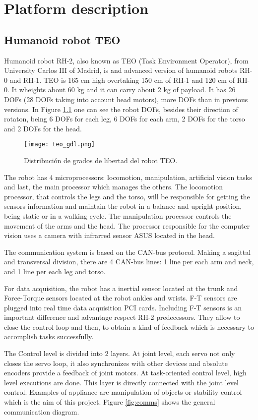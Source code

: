 
\chapter{Platform description} 
\label{cap:platform_description}
\section{Humanoid robot TEO}
Humanoid robot RH-2, also known as TEO (Task Environment Operator), from University Carlos III of Madrid, is and advanced version of humanoid robots RH-0 and RH-1. TEO is 165 cm high overtaking 150 cm of RH-1 and 120 cm of RH-0. It wheights about 60 kg and it can carry about 2 kg of payload. It has 26 DOFs (28 DOFs taking into account head motors), more DOFs than in previous versions. In Figure \ref{fig:gdl} one can see the robot DOFs, besides their direction of rotaton, being 6 DOFs for each leg, 6 DOFs for each arm, 2 DOFs for the torso and 2 DOFs for the head.

\begin{figure}[!hbt]
\centering
\texttt{[image: teo\_gdl.png]}
\caption{Distribución de grados de libertad del robot TEO.}
\label{fig:gdl}
\end{figure}

The robot has 4 microprocessors: locomotion, manipulation, artificial vision tasks and last, the main processor which manages the others. The locomotion processor, that controls the legs and the torso, will be responsible for getting the sensors information and maintain the robot in a balance and upright position, being static or in a walking cycle. The manipulation processor controls the movement of the arms and the head. The processor responsible for the computer vision uses a camera with infrarred sensor ASUS located in the head.

The communication system is based on the CAN-bus protocol. Making a sagittal and transversal division, there are 4 CAN-bus lines: 1 line per each arm and neck, and 1 line per each leg and torso.

For data acquisition, the robot has a inertial sensor located at the trunk and Force-Torque sensors located at the robot ankles and wrists. F-T sensors are plugged into real time data acquisition PCI cards. Including F-T sensors is an important difference and advantage respect RH-2 predecessors. They allow to close the control loop and then, to obtain a kind of feedback which is necessary to accomplish tasks successfully.

The Control level is divided into 2 layers. At joint level, each servo not only closes the servo loop, it also synchronizes with other devices and absolute encoders provide a feedback of joint motors. At task-oriented control level, high level executions are done. This layer is directly connected with the joint level control. Examples of appliance are manipulation of objects or stability control which is the aim of this project. Figure \ref{fig:comms} shows the general communication diagram.

